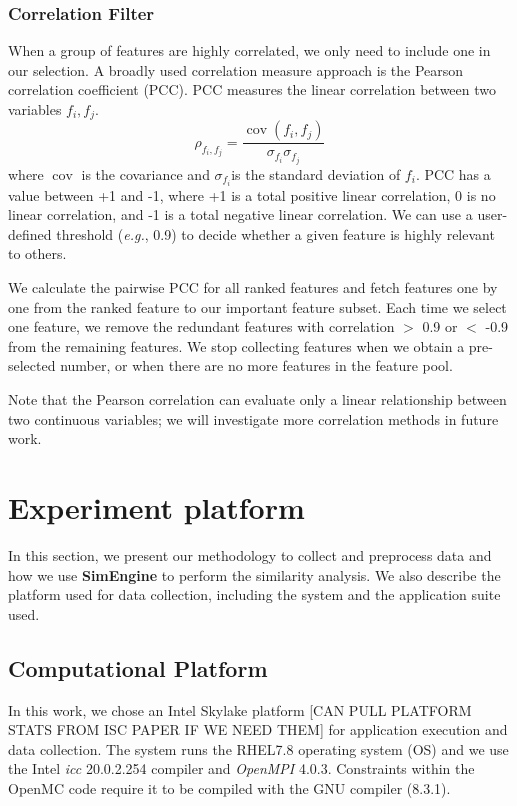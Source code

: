 \documentclass[conference]{IEEEtran}
\newcommand{\us}{\textbf{SimEngine}\xspace}
\newcommand{\eg}                {\emph{e.g.},\xspace}
\begin{document}
\subsubsection{Correlation Filter}
When a group of features are highly correlated, we only need to include one in our selection. A broadly used correlation measure approach is the Pearson correlation coefficient (PCC). PCC measures the linear correlation between two variables $f_{i}, f_{j}$. 
\begin{equation}
\rho_{f_{i}, f_{j}}=\frac{\operatorname{cov}(f_{i}, f_{j})}{\sigma_{f_{i}} \sigma_{f_{j}}}
\end{equation}
where $\operatorname{cov}$ is the covariance and $\sigma_{f_{i}}$is the standard deviation of $f_{i}$.
PCC has a value between +1 and -1, where +1 is a total positive linear correlation, 0 is no linear correlation, and -1 is a total negative linear correlation. We can use a user-defined threshold (\eg 0.9) to decide whether a given feature is highly relevant to others.

We calculate the pairwise PCC for all ranked features and fetch features one by one from the ranked feature to our important feature subset. Each time we select one feature, we remove the redundant features with correlation $>$ 0.9 or $<$ -0.9 from the remaining features. We stop collecting features when we obtain a pre-selected number, or when there are no more features in the feature pool.

Note that the Pearson correlation can evaluate only a linear relationship between two continuous variables; we will investigate more correlation methods in future work.


\section{Experiment platform}
In this section, we present our methodology to collect and preprocess data and how we use \us to perform the similarity analysis. We also describe the platform used for data collection, including the system and the application suite used. 

\subsection{Computational Platform}
In this work, we chose an Intel Skylake platform [CAN PULL PLATFORM STATS FROM ISC PAPER IF WE NEED THEM] for application execution and data collection.  The system runs the RHEL7.8 
operating system (OS) and we use the Intel \emph{icc} 20.0.2.254 compiler and \emph{OpenMPI} 4.0.3.  Constraints within the OpenMC code require it to be compiled with the GNU compiler (8.3.1).   
\end{document}
